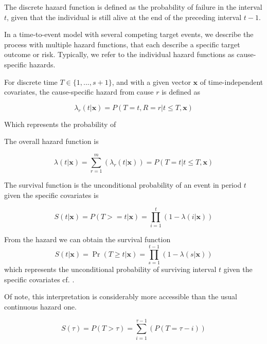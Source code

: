 The discrete hazard function is defined as
the probability of failure in the interval \(t\),
given that the individual is still alive at the end of the preceding interval
\(t - 1\).

In a time-to-event model with several competing target events,
we describe the process with multiple hazard functions, 
that each describe a specific target outcome or risk.
Typically, 
we refer to the individual hazard functions as cause-specific hazards.

For discrete time \(T \in \{1, ..., s+1\}\), and with a given vector \(\mathbf{x}\) of time-independent covariates,
the cause-specific hazard from cause \(r\) is defined as

\begin{equation}
    \lambda_{r}(t|\mathbf{x}) 
    = P(T = t, R = r | t \leq T, \mathbf{x})
\end{equation}

Which represents the probability of 

The overall hazard function is

\begin{equation}
    \lambda(t|\mathbf{x}) 
    = \sum_{r=1}^{m}(\lambda_{r}(t|\mathbf{x}))
    = P(T = t | t \leq T, \mathbf{x})
\end{equation}

The survival function is the unconditional probability of an event in period \(t\) given the specific covariates is 

\begin{equation}
    S(t|\mathbf{x})
    = P(T >= t|\mathbf{x})
    = \prod_{i=1}^{t}(1 - \lambda(i|\mathbf{x}))
\end{equation}

From the hazard we can obtain the survival function 
%
\begin{equation*}
    S(t | \mathbf{x}) 
    = \Pr (T \geq t | \mathbf{x}) 
    = \prod_{s = 1}^{t-1} (1 - \lambda(s | \mathbf{x}))
\end{equation*}
%
which represents the unconditional probability of surviving interval \(t\) given the specific covariates cf. \autocite{tutzModeling2016}.

Of note, this interpretation is considerably more accessible than the usual
continuous hazard one.


\begin{equation}
    S(\tau) = P(T > \tau) = \sum_{i = 1}^{\tau - 1} (P(T = \tau - i))    
\end{equation}

